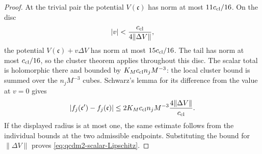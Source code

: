 \documentclass[11pt,letterpaper,reqno]{amsart}
\theoremstyle{definition}
\theoremstyle{remark}
\begin{document}
\begin{proof}
At the trivial pair the potential $V(\mathfrak c)$ has
norm at most $11c_{\rm cl}/16$.  On the disc
\[
 |v|<\frac{c_{\rm cl}}{4\|\Delta V\|},
\]
the potential $V(\mathfrak c)+v\Delta V$ has norm at
most $15c_{\rm cl}/16$.  The tail has norm at most
$c_{\rm cl}/16$, so the cluster theorem applies throughout
this disc.  The scalar total is holomorphic there and
bounded by $K_Mc_{\rm cl}n_jM^{-3}$: the local cluster
bound is summed over the $n_jM^{-3}$ cubes.
Schwarz's lemma for its difference from the value at
$v=0$ gives
\[
 |f_j(\mathfrak c')-f_j(\mathfrak c)|
 \le2K_Mc_{\rm cl}n_jM^{-3}
                \frac{4\|\Delta V\|}{c_{\rm cl}}.
\]
If the displayed radius is at most one, the same estimate
follows from the individual bounds at the two admissible
endpoints.  Substituting the bound for $\|\Delta V\|$ proves
\eqref{eq:qcdm2-scalar-Lipschitz}.
\end{proof}
\end{document}
